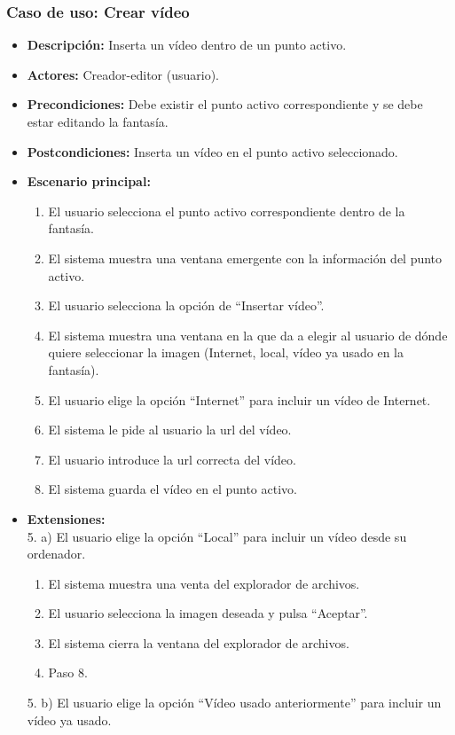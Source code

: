 \subsubsection{Caso de uso: Crear vídeo}
\begin{itemize}
	\item \textbf{Descripción:} Inserta un vídeo dentro de un punto activo.
	\item \textbf{Actores:} Creador-editor (usuario).
	\item \textbf{Precondiciones:} Debe existir el punto activo correspondiente y se debe estar editando la fantasía.
	\item \textbf{Postcondiciones:} Inserta un vídeo en el punto activo seleccionado.
	\item \textbf{Escenario principal:}
	\begin{enumerate}
		\item El usuario selecciona el punto activo correspondiente dentro de la fantasía.
		\item El sistema muestra una ventana emergente con la información del punto activo.
		\item El usuario selecciona la opción de ``Insertar vídeo''.
		\item El sistema muestra una ventana en la que da a elegir al usuario de dónde quiere seleccionar la imagen (Internet, local, vídeo ya usado en la fantasía).
		\item El usuario elige la opción ``Internet'' para incluir un vídeo de Internet.
		\item El sistema le pide al usuario la url del vídeo.
		\item El usuario introduce la url correcta del vídeo.
		\item El sistema guarda el vídeo en el punto activo.
	\end{enumerate}
	\item \textbf{Extensiones:} \\ 5. a) El usuario elige la opción ``Local'' para incluir un vídeo desde su ordenador.
	\begin{enumerate}
		\item El sistema muestra una venta del explorador de archivos.
		\item El usuario selecciona la imagen deseada y pulsa ``Aceptar''.
		\item El sistema cierra la ventana del explorador de archivos.
		\item Paso 8.
	\end{enumerate}
	5. b) El usuario elige la opción ``Vídeo usado anteriormente'' para incluir un vídeo ya usado.

\end{itemize}
